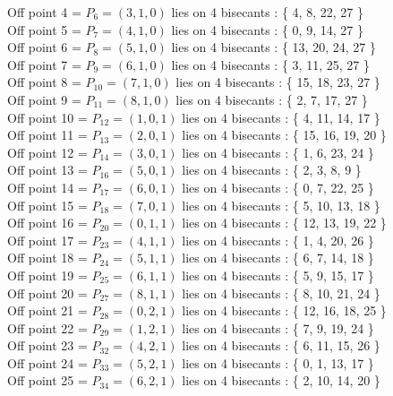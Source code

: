 \documentclass{article}
\begin{document}
{Off point 4 = $P_{6} = ( 3, 1, 0 )$ lies on 4 bisecants : \{ 4, 8, 22, 27 \}\\
Off point 5 = $P_{7} = ( 4, 1, 0 )$ lies on 4 bisecants : \{ 0, 9, 14, 27 \}\\
Off point 6 = $P_{8} = ( 5, 1, 0 )$ lies on 4 bisecants : \{ 13, 20, 24, 27 \}\\
Off point 7 = $P_{9} = ( 6, 1, 0 )$ lies on 4 bisecants : \{ 3, 11, 25, 27 \}\\
Off point 8 = $P_{10} = ( 7, 1, 0 )$ lies on 4 bisecants : \{ 15, 18, 23, 27 \}\\
Off point 9 = $P_{11} = ( 8, 1, 0 )$ lies on 4 bisecants : \{ 2, 7, 17, 27 \}\\
Off point 10 = $P_{12} = ( 1, 0, 1 )$ lies on 4 bisecants : \{ 4, 11, 14, 17 \}\\
Off point 11 = $P_{13} = ( 2, 0, 1 )$ lies on 4 bisecants : \{ 15, 16, 19, 20 \}\\
Off point 12 = $P_{14} = ( 3, 0, 1 )$ lies on 4 bisecants : \{ 1, 6, 23, 24 \}\\
Off point 13 = $P_{16} = ( 5, 0, 1 )$ lies on 4 bisecants : \{ 2, 3, 8, 9 \}\\
Off point 14 = $P_{17} = ( 6, 0, 1 )$ lies on 4 bisecants : \{ 0, 7, 22, 25 \}\\
Off point 15 = $P_{18} = ( 7, 0, 1 )$ lies on 4 bisecants : \{ 5, 10, 13, 18 \}\\
Off point 16 = $P_{20} = ( 0, 1, 1 )$ lies on 4 bisecants : \{ 12, 13, 19, 22 \}\\
Off point 17 = $P_{23} = ( 4, 1, 1 )$ lies on 4 bisecants : \{ 1, 4, 20, 26 \}\\
Off point 18 = $P_{24} = ( 5, 1, 1 )$ lies on 4 bisecants : \{ 6, 7, 14, 18 \}\\
Off point 19 = $P_{25} = ( 6, 1, 1 )$ lies on 4 bisecants : \{ 5, 9, 15, 17 \}\\
Off point 20 = $P_{27} = ( 8, 1, 1 )$ lies on 4 bisecants : \{ 8, 10, 21, 24 \}\\
Off point 21 = $P_{28} = ( 0, 2, 1 )$ lies on 4 bisecants : \{ 12, 16, 18, 25 \}\\
Off point 22 = $P_{29} = ( 1, 2, 1 )$ lies on 4 bisecants : \{ 7, 9, 19, 24 \}\\
Off point 23 = $P_{32} = ( 4, 2, 1 )$ lies on 4 bisecants : \{ 6, 11, 15, 26 \}\\
Off point 24 = $P_{33} = ( 5, 2, 1 )$ lies on 4 bisecants : \{ 0, 1, 13, 17 \}\\
Off point 25 = $P_{34} = ( 6, 2, 1 )$ lies on 4 bisecants : \{ 2, 10, 14, 20 \}\\
}
\end{document}
